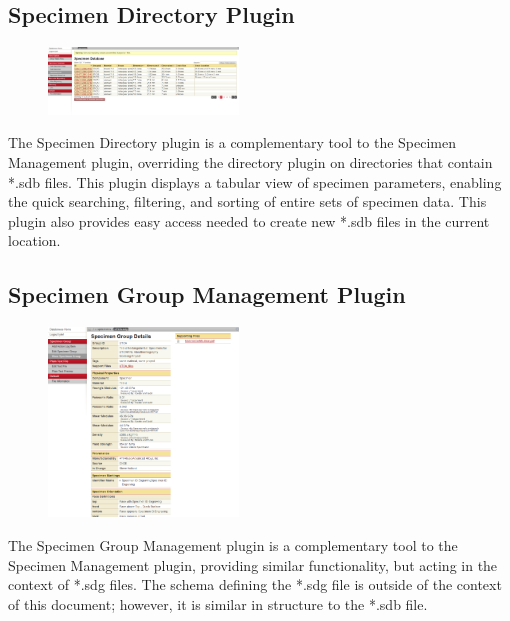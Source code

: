 \documentclass[10pt]{article}
\begin{document}
\subsection{Specimen Directory Plugin}
\begin{figure}
		\includegraphics[width=0.45\textwidth]{Specimen_Directory_Plugin.png}
\end{figure}
The Specimen Directory plugin is a complementary tool to the Specimen Management plugin, overriding the directory plugin on directories that contain *.sdb files.  This plugin displays a tabular view of specimen parameters, enabling the quick searching, filtering, and sorting of entire sets of specimen data.  This plugin also provides easy access needed to create new *.sdb files in the current location.

\endgroup



\begingroup
\setlength\intextsep{0pt}
\subsection{Specimen Group Management Plugin}
\begin{figure}
		\includegraphics[width=0.45\textwidth]{Specimen_Group_Plugin.png}
\end{figure}
The Specimen Group Management plugin is a complementary tool to the Specimen Management plugin, providing similar functionality, but acting in the context of *.sdg files.  The schema defining the *.sdg file is outside of the context of this document; however, it is similar in structure to the *.sdb file.
\end{document}
